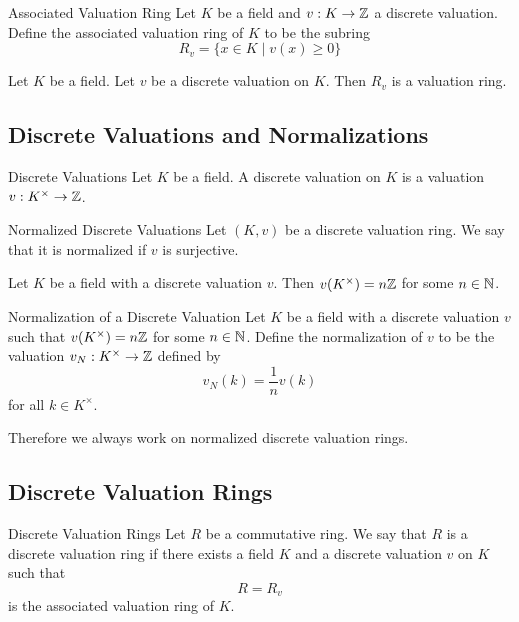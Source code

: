 \documentclass[a4paper]{article}
\begin{document}
\begin{defn}{Associated Valuation Ring}{} Let $K$ be a field and $v:K\to\mathbb{Z}$ a discrete valuation. Define the associated valuation ring of $K$ to be the subring $$R_v=\{x\in K\;|\;v(x)\geq 0\}$$
\end{defn}

\begin{lmm}{}{} Let $K$ be a field. Let $v$ be a discrete valuation on $K$. Then $R_v$ is a valuation ring. 
\end{lmm}

\subsection{Discrete Valuations and Normalizations}
\begin{defn}{Discrete Valuations}{} Let $K$ be a field. A discrete valuation on $K$ is a valuation $v:K^\times\to\mathbb{Z}$. 
\end{defn}

\begin{defn}{Normalized Discrete Valuations}{} Let $(K,v)$ be a discrete valuation ring. We say that it is normalized if $v$ is surjective. 
\end{defn}

\begin{lmm}{}{} Let $K$ be a field with a discrete valuation $v$. Then $v(K^\times)=n\mathbb{Z}$ for some $n\in\mathbb{N}$. 
\end{lmm}

\begin{lmm}{Normalization of a Discrete Valuation}{} Let $K$ be a field with a discrete valuation $v$ such that $v(K^\times)=n\mathbb{Z}$ for some $n\in\mathbb{N}$. Define the normalization of $v$ to be the valuation $v_N:K^\times\to\mathbb{Z}$ defined by $$v_N(k)=\frac{1}{n}v(k)$$ for all $k\in K^\times$. 
\end{lmm}

Therefore we always work on normalized discrete valuation rings. 

\subsection{Discrete Valuation Rings}
\begin{defn}{Discrete Valuation Rings}{} Let $R$ be a commutative ring. We say that $R$ is a discrete valuation ring if there exists a field $K$ and a discrete valuation $v$ on $K$ such that $$R=R_v$$ is the associated valuation ring of $K$. 
\end{defn}
\end{document}
